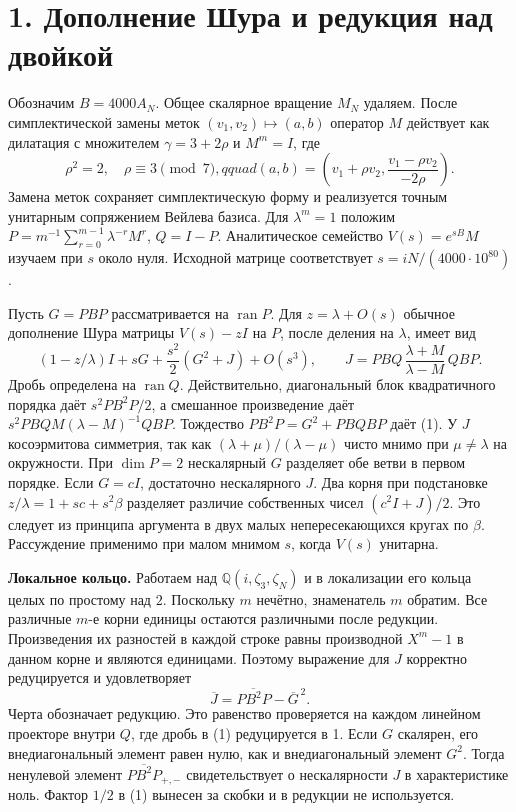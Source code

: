 \documentclass[11pt,a4paper]{article}
\newcommand{\sect}[1]{\section*{\sffamily\color{ink}#1}}
\newcommand{\subt}[1]{\par\medskip\noindent\textbf{#1.}\quad}
\newcommand{\QQ}{\mathbb Q}
\begin{document}
\newpage
\sect{1. Дополнение Шура и редукция над двойкой}
Обозначим \(B=4000A_N\). Общее скалярное вращение \(M_N\) удаляем. После симплектической замены меток \((v_1,v_2)\mapsto(a,b)\) оператор \(M\) действует как дилатация с множителем \(\gamma=3+2\rho\) и \(M^m=I\), где
\[
 \rho^2=2,\quad \rho\equiv3\pmod7,qquad
  (a,b)=\left(v_1+\rho v_2,\frac{v_1-\rho v_2}{-2\rho}\right).
\]
Замена меток сохраняет симплектическую форму и реализуется точным унитарным сопряжением Вейлева базиса. Для \(\lambda^m=1\) положим \(P=m^{-1}\sum_{r=0}^{m-1}\lambda^{-r}M^r\), \(Q=I-P\). Аналитическое семейство \(V(s)=e^{sB}M\) изучаем при \(s\) около нуля. Исходной матрице соответствует \(s=iN/(4000\cdot10^{80})\).

Пусть \(G=PBP\) рассматривается на \(\operatorname{ran}P\). Для \(z=\lambda+O(s)\) обычное дополнение Шура матрицы \(V(s)-zI\) на \(P\), после деления на \(\lambda\), имеет вид
\[
  (1-z/\lambda)I+sG+\frac{s^2}{2}(G^2+J)+O(s^3),
\qquad
 J=PBQ\,\frac{\lambda+M}{\lambda-M}\,QBP.                 \tag{1}
\]
Дробь определена на \(\operatorname{ran}Q\). Действительно, диагональный блок квадратичного порядка даёт \(s^2PB^2P/2\), а смешанное произведение даёт \(s^2PBQM(\lambda-M)^{-1}QBP\). Тождество \(PB^2P=G^2+PBQBP\) даёт (1). У \(J\) косоэрмитова симметрия, так как \((\lambda+\mu)/(\lambda-\mu)\) чисто мнимо при \(\mu\ne\lambda\) на окружности. При \(\dim P=2\) нескалярный \(G\) разделяет обе ветви в первом порядке. Если \(G=cI\), достаточно нескалярного \(J\). Два корня при подстановке \(z/\lambda=1+sc+s^2\beta\) разделяет различие собственных чисел \((c^2I+J)/2\). Это следует из принципа аргумента в двух малых непересекающихся кругах по \(\beta\). Рассуждение применимо при малом мнимом \(s\), когда \(V(s)\) унитарна.

\subt{Локальное кольцо}
Работаем над \(\QQ(i,\zeta_3,\zeta_N)\) и в локализации его кольца целых по простому над \(2\). Поскольку \(m\) нечётно, знаменатель \(m\) обратим. Все различные \(m\)-е корни единицы остаются различными после редукции. Произведения их разностей в каждой строке равны производной \(X^m-1\) в данном корне и являются единицами. Поэтому выражение для \(J\) корректно редуцируется и удовлетворяет
\[
          \overline J=\overline{PB^2P}-\overline G^{\,2}.     \tag{2}
\]
Черта обозначает редукцию. Это равенство проверяется на каждом линейном проекторе внутри \(Q\), где дробь в (1) редуцируется в 1. Если \(G\) скалярен, его внедиагональный элемент равен нулю, как и внедиагональный элемент \(G^2\). Тогда ненулевой элемент \(\overline{PB^2P}_{+,-}\) свидетельствует о нескалярности \(J\) в характеристике ноль. Фактор \(1/2\) в (1) вынесен за скобки и в редукции не используется.
\end{document}

